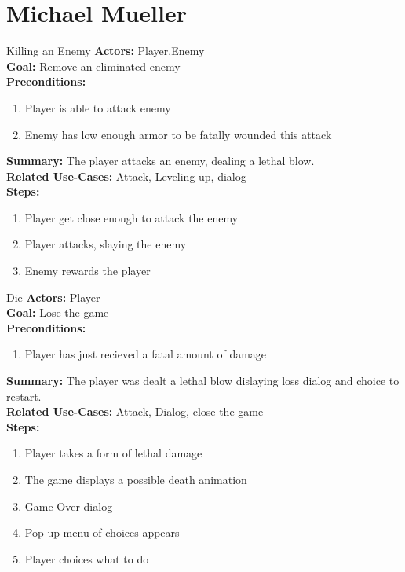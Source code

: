 \documentclass[12pt]{report}
\begin{document}
\section{Michael Mueller}
\begin{subsection}{Killing an Enemy}
\textbf{Actors:} Player,Enemy \\
\textbf{Goal:} Remove an eliminated enemy \\
\textbf{Preconditions:}
\begin{enumerate}
       \item Player is able to attack enemy
       \item Enemy has low enough armor to be fatally wounded this attack
\end{enumerate}
\textbf{Summary:} The player attacks an enemy, dealing a lethal blow. \\
\textbf{Related Use-Cases:} Attack, Leveling up, dialog \\
\textbf{Steps:}
\begin{enumerate}
	\item Player get close enough to attack the enemy
	\item Player attacks, slaying the enemy
	\item Enemy rewards the player
\end{enumerate}
\end{subsection}
\begin{subsection}{Die}
\textbf{Actors:} Player \\
\textbf{Goal:} Lose the game \\
\textbf{Preconditions:}
\begin{enumerate}
       \item Player has just recieved a fatal amount of damage
\end{enumerate}
\textbf{Summary:} The player was dealt a lethal blow dislaying loss dialog and choice to restart. \\
\textbf{Related Use-Cases:} Attack, Dialog, close the game \\
\textbf{Steps:}
\begin{enumerate}
	\item Player takes a form of lethal damage
	\item The game displays a possible death animation
	\item Game Over dialog
	\item Pop up menu of choices appears
	\item Player choices what to do
\end{enumerate}
\end{subsection}
\end{document}

